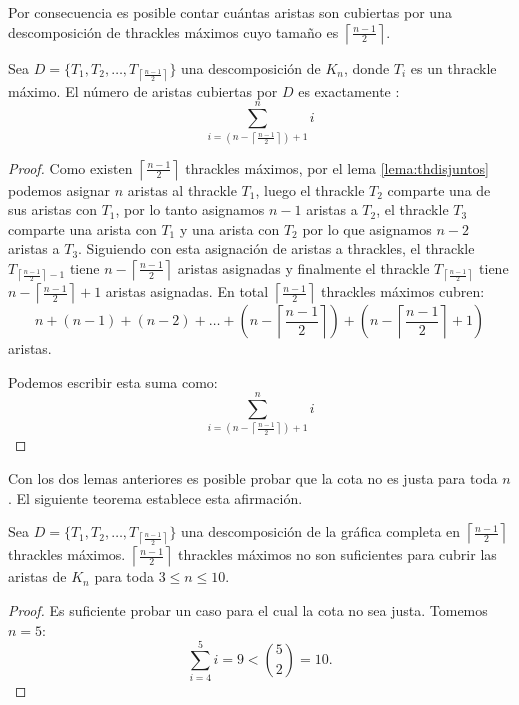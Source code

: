 Por consecuencia es posible contar cuántas aristas son cubiertas
por una descomposición de thrackles máximos cuyo tamaño es $\left\lceil\frac{n-1}{2}\right\rceil$.
\begin{lemma}\label{lema:numerocubiertas}
  Sea $D=\{T_1,T_2,\dots,T_{\left\lceil\frac{n-1}{2}\right\rceil}\}$ una descomposición
  de $K_n$, donde $T_i$ es un thrackle máximo. El número de aristas cubiertas por $D$
  es exactamente :
   \[\displaystyle \sum^n_{i=\left(n-\left\lceil\frac{n-1}{2}\right\rceil\right) + 1}i\]
 \end{lemma}
 \begin{proof}
   Como existen $\left\lceil\frac{n-1}{2}\right\rceil$ thrackles máximos, por el lema
   \ref{lema:thdisjuntos} podemos asignar $n$ aristas al thrackle $T_1$, luego el thrackle
   $T_2$ comparte una de sus aristas con $T_1$, por lo tanto asignamos $n-1$ aristas a $T_2$,
   el thrackle $T_3$ comparte una arista con $T_1$ y una arista con $T_2$ por lo que asignamos
   $n-2$ aristas a $T_3$. Siguiendo con esta asignación de aristas a thrackles, el thrackle
   $T_{\left\lceil\frac{n-1}{2}\right\rceil-1}$ tiene $n-\left\lceil\frac{n-1}{2}\right\rceil$
   aristas asignadas y finalmente el thrackle $T_{\left\lceil\frac{n-1}{2}\right\rceil}$ tiene
   $n-\left\lceil\frac{n-1}{2}\right\rceil+1$ aristas asignadas. En total $\left\lceil\frac{n-1}{2}\right\rceil$
   thrackles máximos cubren: \[ n+(n-1)+(n-2)+\dots+(n-\left\lceil\frac{n-1}{2}\right\rceil) + (n-\left\lceil\frac{n-1}{2}\right\rceil+1)\] aristas.

   Podemos escribir esta suma como:
   \[\displaystyle \sum^n_{i=\left(n-\left\lceil\frac{n-1}{2}\right\rceil\right) + 1}i\]
 \end{proof}
%

Con los dos lemas anteriores es posible probar que la cota no es justa
para toda $n$. El siguiente teorema establece esta afirmación.
\begin{theorem}
Sea $D=\{T_1,T_2,\dots,T_{\left\lceil\frac{n-1}{2}\right\rceil}\}$ una descomposición
de la gráfica completa en $\left\lceil\frac{n-1}{2}\right\rceil$ thrackles máximos.
$\left\lceil\frac{n-1}{2}\right\rceil$ thrackles
máximos no son suficientes para cubrir las aristas de $K_n$ para toda $3 \leq n \leq 10$.
\end{theorem}
\begin{proof}
  Es suficiente probar un caso para el cual la cota no sea justa. Tomemos $n=5$:
  \[\displaystyle \sum^5_{i=4}i = 9 < \binom{5}{2}=10.\]
\end{proof}

